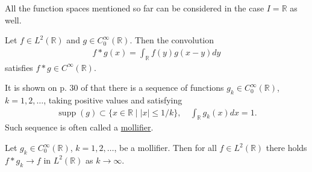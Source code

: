 \documentclass[12pt,oneside]{amsart}
\def\R{\mathbb R}
\DeclareMathOperator{\supp}{supp}
\begin{document}
All the function spaces mentioned so far can be considered in the case $I = \R$ as well.

\begin{theorem}\label{th_smoothing}
Let $f \in L^2(\R)$ and $g \in C_0^\infty(\R)$. Then the convolution
    \begin{align*}
f * g(x) = \int_\R f(y) g(x - y) dy
    \end{align*}
satisfies $f * g \in C^\infty(\R)$.
\end{theorem}

It is shown on p. 30 of \cite{Holopainen} that 
there is a sequence of functions $g_k \in C_0^\infty(\R)$, $k=1,2,\dots$, taking positive values and satisfying 
    \begin{align}\label{def_mollifier}
\supp(g) \subset \{x \in \R \mid |x| \le 1/k\},
\quad
\int_\R g_k(x) dx = 1.
    \end{align}
Such sequence is often called a \href{https://en.wikipedia.org/wiki/Mollifier}{mollifier}.

\begin{theorem}\label{th_mollification}
Let $g_k \in C_0^\infty(\R)$, $k=1,2,\dots$,
be a mollifier. Then for all $f \in L^2(\R)$ there holds $f * g_k \to f$ in $L^2(\R)$ as $k \to \infty$. 
\end{theorem}
\end{document}
